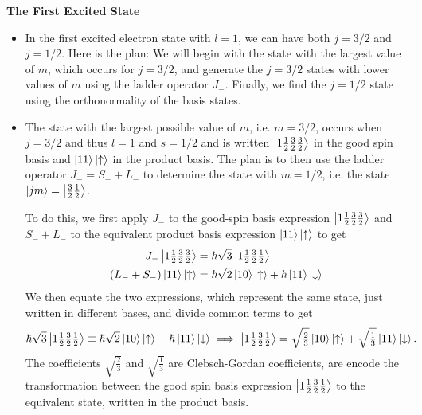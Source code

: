 \documentclass[11pt, a4paper]{article}
\newcommand{\ua}{\uparrow}  %
\newcommand{\da}{\downarrow}  %
\begin{document}
\textbf{The First Excited State}
\begin{itemize}
    \item In the first excited electron state with $ l = 1 $, we can have both $ j = 3/2 $ and $ j = 1/2 $. Here is the plan: We will begin with the state with the largest value of $ m $, which occurs for $ j = 3/2 $, and generate the $ j = 3/2 $ states with lower values of $ m $ using the ladder operator $ J_{-} $. Finally, we find the $ j = 1/2 $ state using the orthonormality of the basis states. 

    \item The state with the largest possible value of $ m $, i.e. $ m = 3/2 $, occurs when $ j = 3/2 $ and thus $ l = 1 $ and $ s = 1/2 $ and is written $ \ket{1 \tfrac{1}{2} \tfrac{3}{2} \tfrac{3}{2}} $ in the good spin basis and $ \ket{11}\ket{\ua} $ in the product basis. The plan is to then use the ladder operator $ J_{-} = S_{-} + L_{-} $ to determine the state with $ m = 1/2 $, i.e. the state $ \ket{jm} = \ket{\tfrac{3}{2}\tfrac{1}{2}} $. 

    To do this, we first apply $ J_{-} $ to the good-spin basis expression $ \ket{1 \tfrac{1}{2} \tfrac{3}{2} \tfrac{3}{2}} $ and $ S_{-} + L_{-} $ to the equivalent product basis expression $ \ket{11}\ket{\ua} $ to get
    \begin{align*}
        J_{-} \ket{1 \tfrac{1}{2} \tfrac{3}{2}\tfrac{3}{2}} &= \hbar \sqrt{3} \ket{1 \tfrac{1}{2} \tfrac{3}{2} \tfrac{1}{2}}\\
        (L_{-} + S_{-}) \ket{11}\ket{\ua} &= \hbar \sqrt{2} \ket{10}\ket{\ua} + \hbar \ket{11} \ket{\da}
    \end{align*}
    We then equate the two expressions, which represent the same state, just written in different bases, and divide common terms to get
    \begin{equation*}
        \hbar \sqrt{3} \ket{1 \tfrac{1}{2} \tfrac{3}{2} \tfrac{1}{2}} \equiv \hbar \sqrt{2} \ket{10}\ket{\ua} + \hbar \ket{11}\ket{\da} \implies
        \ket{1 \tfrac{1}{2}\tfrac{3}{2}\tfrac{1}{2}} = \sqrt{\tfrac{2}{3}}\ket{10}\ket{\ua} + \sqrt{\tfrac{1}{3}} \ket{11}\ket{\da}.
    \end{equation*}
    The coefficients $ \sqrt{\frac{2}{3}} $ and $ \sqrt{\frac{1}{3}} $ are Clebsch-Gordan coefficients, are encode the transformation between the good spin basis expression $ \ket{1 \tfrac{1}{2} \tfrac{3}{2} \tfrac{1}{2}} $ to the equivalent state, written in the product basis.
    

\end{itemize}
\end{document}
